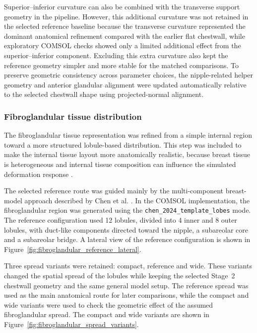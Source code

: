 Superior--inferior curvature can also be combined with the transverse support geometry in the pipeline. However, this additional curvature was not retained in the selected reference baseline because the transverse curvature represented the dominant anatomical refinement compared with the earlier flat chestwall, while exploratory COMSOL checks showed only a limited additional effect from the superior--inferior component. Excluding this extra curvature also kept the reference geometry simpler and more stable for the matched comparisons. To preserve geometric consistency across parameter choices, the nipple-related helper geometry and anterior glandular alignment were updated automatically relative to the selected chestwall shape using projected-normal alignment.


\subsubsection{Fibroglandular tissue distribution}
\label{sec:fibroglandular_tissue_distribution}

The fibroglandular tissue representation was refined from a simple internal region toward a more structured lobule-based distribution. This step was included to make the internal tissue layout more anatomically realistic, because breast tissue is heterogeneous and internal tissue composition can influence the simulated deformation response \cite{Chen2024,Mazier2024}.

The selected reference route was guided mainly by the multi-component breast-model approach described by Chen et al. \cite{Chen2024}. In the COMSOL implementation, the fibroglandular region was generated using the \texttt{chen\_2024\_template\_lobes} mode. The reference configuration used 12 lobules, divided into 4 inner and 8 outer lobules, with duct-like components directed toward the nipple, a subareolar core and a subareolar bridge. A lateral view of the reference configuration is shown in Figure~\ref{fig:fibroglandular_reference_lateral}.

Three spread variants were retained: compact, reference and wide. These variants changed the spatial spread of the lobules while keeping the selected Stage~2 chestwall geometry and the same general model setup. The reference spread was used as the main anatomical route for later comparisons, while the compact and wide variants were used to check the geometric effect of the assumed fibroglandular spread. The compact and wide variants are shown in Figure~\ref{fig:fibroglandular_spread_variants}.

